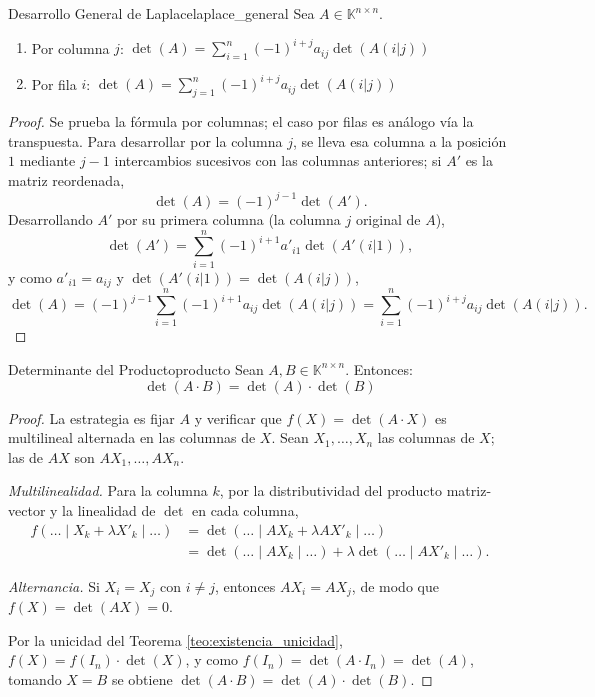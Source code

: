 \documentclass[11pt, a4paper]{article}
\begin{document}
\begin{proposicion}{Desarrollo General de Laplace}{laplace_general}
Sea $A \in \mathbb{K}^{n \times n}$.
\begin{enumerate}
    \item Por columna $j$: $\det(A) = \sum_{i=1}^n (-1)^{i+j} a_{ij} \det(A(i|j))$
    \item Por fila $i$: $\det(A) = \sum_{j=1}^n (-1)^{i+j} a_{ij} \det(A(i|j))$
\end{enumerate}
\end{proposicion}

\begin{proof}
Se prueba la fórmula por columnas; el caso por filas es análogo vía la transpuesta. Para desarrollar por la columna $j$, se lleva esa columna a la posición $1$ mediante $j-1$ intercambios sucesivos con las columnas anteriores; si $A'$ es la matriz reordenada,
\[ \det(A) = (-1)^{j-1} \det(A'). \]
Desarrollando $A'$ por su primera columna (la columna $j$ original de $A$),
\[ \det(A') = \sum_{i=1}^n (-1)^{i+1} a'_{i1} \det(A'(i|1)), \]
y como $a'_{i1} = a_{ij}$ y $\det(A'(i|1)) = \det(A(i|j))$,
\[
\det(A) = (-1)^{j-1} \sum_{i=1}^n (-1)^{i+1} a_{ij} \det(A(i|j)) = \sum_{i=1}^n (-1)^{i+j} a_{ij} \det(A(i|j)).
\]
\end{proof}

\begin{proposicion}{Determinante del Producto}{producto}
Sean $A, B \in \mathbb{K}^{n \times n}$. Entonces:
\[ \det(A \cdot B) = \det(A) \cdot \det(B) \]
\end{proposicion}

\begin{proof}
La estrategia es fijar $A$ y verificar que $f(X) = \det(A \cdot X)$ es multilineal alternada en las columnas de $X$. Sean $X_1, \dots, X_n$ las columnas de $X$; las de $AX$ son $AX_1, \dots, AX_n$.

\textit{Multilinealidad.} Para la columna $k$, por la distributividad del producto matriz-vector y la linealidad de $\det$ en cada columna,
\begin{align*}
f(\dots \mid X_k + \lambda X'_k \mid \dots) &= \det(\dots \mid AX_k + \lambda AX'_k \mid \dots) \\
&= \det(\dots \mid AX_k \mid \dots) + \lambda \det(\dots \mid AX'_k \mid \dots).
\end{align*}

\textit{Alternancia.} Si $X_i = X_j$ con $i \neq j$, entonces $AX_i = AX_j$, de modo que $f(X) = \det(AX) = 0$.

Por la unicidad del Teorema \ref{teo:existencia_unicidad}, $f(X) = f(I_n) \cdot \det(X)$, y como $f(I_n) = \det(A \cdot I_n) = \det(A)$, tomando $X = B$ se obtiene $\det(A \cdot B) = \det(A) \cdot \det(B)$.
\end{proof}
\end{document}
